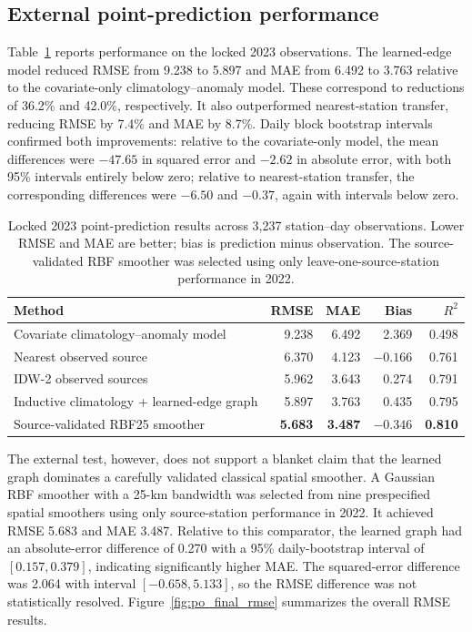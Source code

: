 \subsection{External point-prediction performance}
\label{subsec:po_point_results}

Table~\ref{tab:po_final_point} reports performance on the locked 2023 observations. The learned-edge model reduced RMSE from 9.238 to 5.897 and MAE from 6.492 to 3.763 relative to the covariate-only climatology--anomaly model. These correspond to reductions of 36.2\% and 42.0\%, respectively. It also outperformed nearest-station transfer, reducing RMSE by 7.4\% and MAE by 8.7\%. Daily block bootstrap intervals confirmed both improvements: relative to the covariate-only model, the mean differences were $-47.65$ in squared error and $-2.62$ in absolute error, with both 95\% intervals entirely below zero; relative to nearest-station transfer, the corresponding differences were $-6.50$ and $-0.37$, again with intervals below zero.

\begin{table}[htbp]
\centering
\caption{Locked 2023 point-prediction results across 3,237 station--day observations. Lower RMSE and MAE are better; bias is prediction minus observation. The source-validated RBF smoother was selected using only leave-one-source-station performance in 2022.}
\label{tab:po_final_point}
\begin{tabular}{lrrrr}
\toprule
Method & RMSE & MAE & Bias & $R^2$ \\
\midrule
Covariate climatology--anomaly model & 9.238 & 6.492 & 2.369 & 0.498 \\
Nearest observed source & 6.370 & 4.123 & $-0.166$ & 0.761 \\
IDW-2 observed sources & 5.962 & 3.643 & 0.274 & 0.791 \\
Inductive climatology + learned-edge graph & 5.897 & 3.763 & 0.435 & 0.795 \\
Source-validated RBF25 smoother & \textbf{5.683} & \textbf{3.487} & $-0.346$ & \textbf{0.810} \\
\bottomrule
\end{tabular}
\end{table}

The external test, however, does not support a blanket claim that the learned graph dominates a carefully validated classical spatial smoother. A Gaussian RBF smoother with a 25-km bandwidth was selected from nine prespecified spatial smoothers using only source-station performance in 2022. It achieved RMSE 5.683 and MAE 3.487. Relative to this comparator, the learned graph had an absolute-error difference of 0.270 with a 95\% daily-bootstrap interval of $[0.157,0.379]$, indicating significantly higher MAE. The squared-error difference was 2.064 with interval $[-0.658,5.133]$, so the RMSE difference was not statistically resolved. Figure~\ref{fig:po_final_rmse} summarizes the overall RMSE results.


